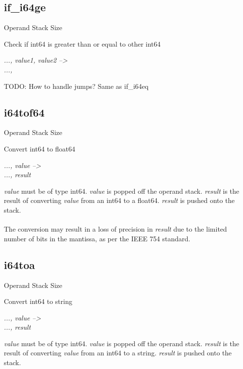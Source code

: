 \documentclass[12pt]{article}
\begin{document}
		\subsection*{if\_i64ge}
			\begin{labeling}{Operand Stack Size}
				\item [\textbf{Operation}] Check if int64 is greater than or equal to other int64
				\item [\textbf{Format}] 
				\item [\textbf{Operand Stack}] \textit{..., value1, value2 --\textgreater} \\
										\textit{..., }
				\item [\textbf{Description}] TODO: How to handle jumps? Same as if\_i64eq
			\end{labeling}	
		\newpage
		\subsection*{i64tof64}
			\begin{labeling}{Operand Stack Size}
				\item [\textbf{Operation}] Convert int64 to float64
				\item [\textbf{Format}] 
				\item [\textbf{Operand Stack}] \textit{..., value --\textgreater} \\
										\textit{..., result}
				\item [\textbf{Description}] \textit{value} must be of type int64. \textit{value} is popped off the operand stack. \textit{result} is the result of converting \textit{value} from an int64 to a float64. \textit{result} is pushed onto the stack. \\ \\
				The conversion may result in a loss of precision in \textit{result} due to the limited number of bits in the mantissa, as per the IEEE 754 standard. 
			\end{labeling}	
		\newpage
		
		\subsection*{i64toa}
			\begin{labeling}{Operand Stack Size}
				\item [\textbf{Operation}] Convert int64 to string
				\item [\textbf{Format}] 
				\item [\textbf{Operand Stack}] \textit{..., value --\textgreater} \\
										\textit{..., result}
				\item [\textbf{Description}] \textit{value} must be of type int64. \textit{value} is popped off the operand stack. \textit{result} is the result of converting \textit{value} from an int64 to a string. \textit{result} is pushed onto the stack. \\ \\
			\end{labeling}	
		\newpage
		
\end{document}
